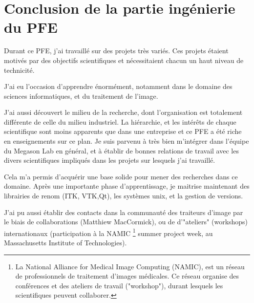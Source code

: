 \section{Conclusion de la partie ingénierie du PFE}

Durant ce PFE, j'ai travaillé sur des projets très variés.
Ces projets étaient motivés par des objectifs scientifiques et nécessitaient chacun un haut niveau de technicité.

J'ai eu l'occasion d'apprendre énormément,
notamment dans le domaine des sciences informatiques,
et du traitement de l'image.

J'ai aussi découvert le milieu de la recherche, dont l'organisation est
totalement différente de celle du milieu industriel.
La hiérarchie, et les intérêts de chaque scientifique sont moins apparents que dans une entreprise et ce PFE a été riche en enseignements sur ce plan.
Je suis parvenu à très bien m'intégrer dans l'équipe du Megason Lab en général,
et à établir de bonnes relations de travail avec les divers scientifiques
impliqués dans les projets sur lesquels j'ai travaillé.

Cela m'a permis d'acquérir une base solide pour mener des recherches dans ce domaine.
Après une importante phase d'apprentissage, je maitrise maintenant des librairies de renom
(ITK, VTK,Qt), les systèmes unix, et la gestion de versions.

J'ai pu aussi établir des contacts dans la communauté
des traiteurs d'image par le biais de collaborations
(Matthiew MacCormick), ou de d'"ateliers" (workshops) internationaux
(participation à la NAMIC
\footnote{La National Alliance for Medical Image Computing (NAMIC), est un réseau de professionnels de traitement d'images médicales. Ce réseau organise des conférences et des ateliers de travail ("workshop"), durant lesquels les scientifiques peuvent collaborer.}
summer project week, au Massachusetts Institute of Technologies).
